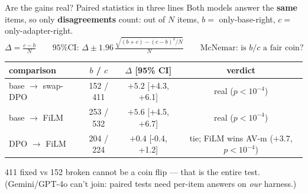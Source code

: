 \documentclass[aspectratio=169,11pt]{beamer}
\begin{document}
\begin{frame}{Are the gains real? Paired statistics in three lines}
{\footnotesize Both models answer the \textbf{same} items, so only \textbf{disagreements} count:
out of $N$ items, $b=$ only-base-right, $c=$ only-adapter-right.}
{\footnotesize
\[
\Delta=\tfrac{c-b}{N}\qquad
\text{95\% CI: }\Delta\pm 1.96\,\tfrac{\sqrt{(b+c)-(c-b)^2/N}}{N}\qquad
\text{McNemar: is }b/c\text{ a fair coin?}
\]}
\centering
\scriptsize
\renewcommand{\arraystretch}{1.1}
\begin{tabular}{l c c c}
\toprule
comparison & $b$ / $c$ & $\Delta$ [95\% CI] & verdict \\
\midrule
base $\to$ swap-DPO & 152 / 411 & $+5.2$ [{+}4.3, {+}6.1] & real ($p<10^{-4}$) \\
base $\to$ FiLM     & 253 / 532 & $+5.6$ [{+}4.5, {+}6.7] & real ($p<10^{-4}$) \\
DPO $\to$ FiLM      & 204 / 224 & $+0.4$ [{-}0.4, {+}1.2] & tie; FiLM wins AV-m ($+3.7$, $p<10^{-4}$) \\
\bottomrule
\end{tabular}
\vspace{0.4em}
\par
{\footnotesize 411 fixed vs 152 broken cannot be a coin flip --- that is the entire test.
(Gemini/GPT-4o can't join: paired tests need per-item answers on \emph{our} harness.)}
\end{frame}
\end{document}
